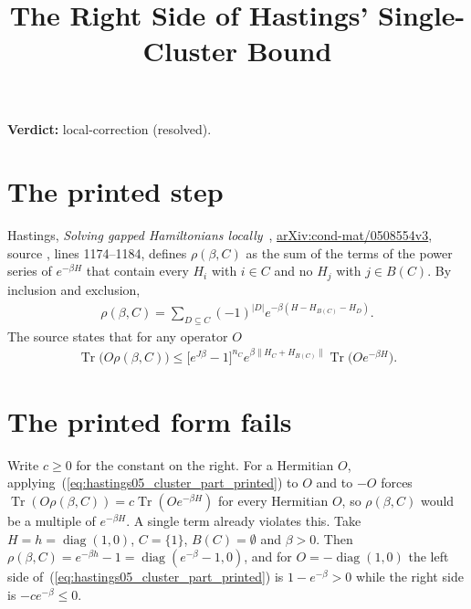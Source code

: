 \documentclass{article}
\title{The Right Side of Hastings' Single-Cluster Bound}
\author{}
\date{}
\providecommand{\gapnote}[2]{\par\noindent\textbf{Verdict:} #1 (#2).\par}
\begin{document}
\maketitle
\gapnote{local-correction}{resolved}

\section{The printed step}
Hastings, \emph{Solving gapped Hamiltonians locally}~\cite{Hastings2006Solving},
\href{https://arxiv.org/abs/cond-mat/0508554v3}{arXiv:cond-mat/0508554v3},
source , lines 1174--1184, defines $\rho(\beta,C)$ as the
sum of the terms of the power series of $e^{-\beta H}$ that contain every
$H_i$ with $i\in C$ and no $H_j$ with $j\in B(C)$. By inclusion and
exclusion,
\begin{align*}
 \rho(\beta,C)=\sum_{D\subseteq C}(-1)^{|D|}e^{-\beta(H-H_{B(C)}-H_D)}.
\end{align*}
The source states that for any operator $O$
\begin{align}
 \operatorname{Tr}\bigl(O\rho(\beta,C)\bigr)
 \le\bigl[e^{J\beta}-1\bigr]^{n_C}e^{\beta\|H_C+H_{B(C)}\|}
 \operatorname{Tr}\bigl(Oe^{-\beta H}\bigr).
 \label{eq:hastings05_cluster_part_printed}
\end{align}

\section{The printed form fails}
Write $c\ge0$ for the constant on the right. For a Hermitian $O$,
applying~(\ref{eq:hastings05_cluster_part_printed}) to $O$ and to $-O$ forces
$\operatorname{Tr}(O\rho(\beta,C))=c\operatorname{Tr}(Oe^{-\beta H})$ for
every Hermitian $O$, so $\rho(\beta,C)$ would be a multiple of $e^{-\beta H}$.
A single term already violates this. Take $H=h=\operatorname{diag}(1,0)$,
$C=\{1\}$, $B(C)=\emptyset$ and $\beta>0$. Then
$\rho(\beta,C)=e^{-\beta h}-1=\operatorname{diag}(e^{-\beta}-1,0)$, and for
$O=-\operatorname{diag}(1,0)$ the left side
of~(\ref{eq:hastings05_cluster_part_printed}) is $1-e^{-\beta}>0$ while the
right side is $-ce^{-\beta}\le0$.
\end{document}
